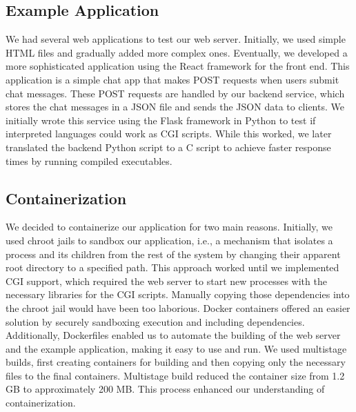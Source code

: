 \subsection*{Example Application}

We had several web applications to test our web server. Initially, we used simple HTML files and gradually added more complex ones. Eventually, we developed a more sophisticated application using the React framework for the front end. This application is a simple chat app that makes POST requests when users submit chat messages. These POST requests are handled by our backend service, which stores the chat messages in a JSON file and sends the JSON data to clients. We initially wrote this service using the Flask framework in Python to test if interpreted languages could work as CGI scripts. While this worked, we later translated the backend Python script to a C script to achieve faster response times by running compiled executables.

\subsection*{Containerization}

We decided to containerize our application for two main reasons. Initially, we used chroot jails to sandbox our application, i.e., a mechanism that isolates a process and its children from the rest of the system by changing their apparent root directory to a specified path. This approach worked until we implemented CGI support, which required the web server to start new processes with the necessary libraries for the CGI scripts. Manually copying those dependencies into the chroot jail would have been too laborious. Docker containers offered an easier solution by securely sandboxing execution and including dependencies. Additionally, Dockerfiles enabled us to automate the building of the web server and the example application, making it easy to use and run. We used multistage builds, first creating containers for building and then copying only the necessary files to the final containers. Multistage build reduced the container size from 1.2 GB to approximately 200 MB. This process enhanced our understanding of containerization.
